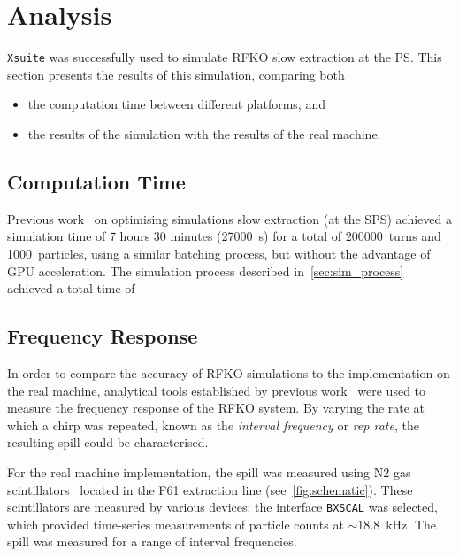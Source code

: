\documentclass[11pt]{report}
\begin{document}
\chapter{Analysis}

\verb|Xsuite| was successfully used to simulate RFKO slow extraction at the PS. This section presents the results of this simulation, comparing both
\begin{itemize}
  \item the computation time between different platforms, and
  \item the results of the simulation with the results of the real machine.
\end{itemize}

\section{Computation Time}

Previous work~\cite{Schicho:2039579} on optimising simulations slow extraction (at the SPS) achieved a simulation time of 7 hours 30 minutes (\qty{27000}{\second}) for a total of \qty{200000}{turns} and \qty{1000}{particles}, using a similar batching process, but without the advantage of GPU acceleration. The simulation process described in~\autoref{sec:sim_process} achieved a total time of





\section{Frequency Response}

In order to compare the accuracy of RFKO simulations to the implementation on the real machine, analytical tools established by previous work~\cite{Pari:2780495} were used to measure the frequency response of the RFKO system. By varying the rate at which a chirp was repeated, known as the \textit{interval frequency} or \textit{rep rate}, the resulting spill could be characterised. 

For the real machine implementation, the spill was measured using N2 gas scintillators~\cite{Actis:bxscint} located in the F61 extraction line (see~\autoref{fig:schematic}). These scintillators are measured by various devices: the interface \verb|BXSCAL| was selected, which provided time-series measurements of particle counts at $\sim$\qty{18.8}{\kilo\hertz}. The spill was measured for a range of interval frequencies.
\end{document}
